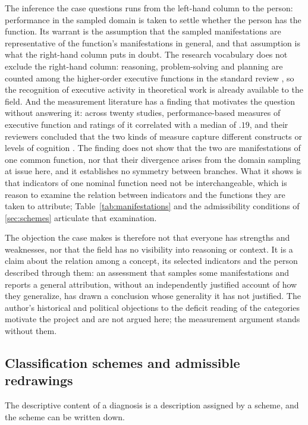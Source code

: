 The inference the case questions runs from the left-hand column to the person: performance in the sampled domain is taken to settle whether the person has the function. Its warrant is the assumption that the sampled manifestations are representative of the function's manifestations in general, and that assumption is what the right-hand column puts in doubt. The research vocabulary does not exclude the right-hand column: reasoning, problem-solving and planning are counted among the higher-order executive functions in the standard review \cite{Diamond2013}, so the recognition of executive activity in theoretical work is already available to the field. And the measurement literature has a finding that motivates the question without answering it: across twenty studies, performance-based measures of executive function and ratings of it correlated with a median of $.19$, and their reviewers concluded that the two kinds of measure capture different constructs or levels of cognition \cite{Toplak2013}. The finding does not show that the two are manifestations of one common function, nor that their divergence arises from the domain sampling at issue here, and it establishes no symmetry between branches. What it shows is that indicators of one nominal function need not be interchangeable, which is reason to examine the relation between indicators and the functions they are taken to attribute; Table~\ref{tab:manifestations} and the admissibility conditions of \autoref{sec:schemes} articulate that examination.

The objection the case makes is therefore not that everyone has strengths and weaknesses, nor that the field has no visibility into reasoning or context. It is a claim about the relation among a concept, its selected indicators and the person described through them: an assessment that samples some manifestations and reports a general attribution, without an independently justified account of how they generalize, has drawn a conclusion whose generality it has not justified. The author's historical and political objections to the deficit reading of the categories motivate the project and are not argued here; the measurement argument stands without them.

\subsection{Classification schemes and admissible redrawings}
\label{sec:schemes}

The descriptive content of a diagnosis is a description assigned by a scheme, and the scheme can be written down.


